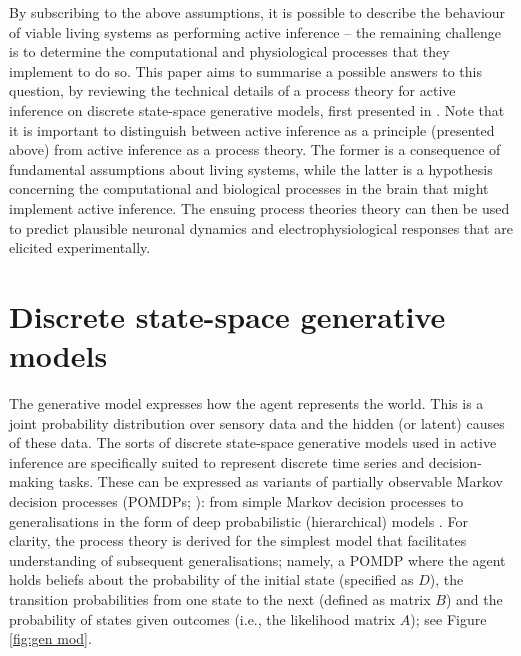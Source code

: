 \documentclass{article}
\begin{document}
By subscribing to the above assumptions, it is possible to describe the behaviour of viable living systems as performing active inference -- the remaining challenge is to determine the computational and physiological processes that they implement to do so. This paper aims to summarise a possible answers to this question, by reviewing the technical details of a process theory for active inference on discrete state-space generative models, first presented in \cite{fristonActiveInferenceProcess2017}. Note that it is important to distinguish between active inference as a principle (presented above) from active inference as a process theory. The former is a consequence of fundamental assumptions about living systems, while the latter is a hypothesis concerning the computational and biological processes in the brain that might implement active inference. The ensuing process theories theory can then be used to predict plausible neuronal dynamics and electrophysiological responses that are elicited experimentally.

\section{Discrete state-space generative models}

The generative model \cite{bishopPatternRecognitionMachine2006} expresses how the agent represents the world. This is a joint probability distribution over sensory data and the hidden (or latent) causes of these data. The sorts of discrete state-space generative models used in active inference are specifically suited to represent discrete time series and decision-making tasks. These can be expressed as variants of partially observable Markov decision processes (POMDPs; \cite{astromOptimalControlMarkov1965}): from simple Markov decision processes \cite{bartoReinforcementLearningIntroduction1992,stoneArtificialIntelligenceEngines2019,whiteMarkovDecisionProcesses2001} to generalisations in the form of deep probabilistic (hierarchical) models \cite{fristonDeepTemporalModels2018,boxMultiparameterProblemsBayesian1965,allenbyHierarchicalBayesModels2005}. For clarity, the process theory is derived for the simplest model that facilitates understanding of subsequent generalisations; namely, a POMDP where the agent holds beliefs about the probability of the initial state (specified as $D$), the transition probabilities from one state to the next (defined as matrix $B$) and the probability of states given outcomes (i.e., the likelihood matrix $A$); see Figure \ref{fig:gen mod}.
\end{document}
